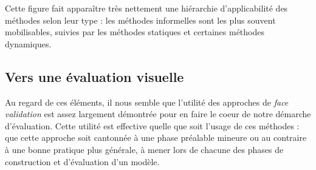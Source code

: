 Cette figure fait apparaître très nettement une \og hiérarchie\fg{} d'applicabilité des méthodes selon leur type : les méthodes informelles sont les plus souvent mobilisables, suivies par les méthodes statiques et certaines méthodes dynamiques.

\subsection{Vers une évaluation visuelle \label{subsec:eval-visuelle}}

Au regard de ces éléments, il nous semble que l'utilité des approches de \textit{face validation} est assez largement démontrée pour en faire le coeur de notre démarche d'évaluation.
Cette utilité est effective quelle que soit l'usage de ces méthodes : que cette approche soit cantonnée à une phase préalable mineure ou au contraire à une bonne pratique plus générale, à mener lors de chacune des phases de construction et d'évaluation d'un modèle.

